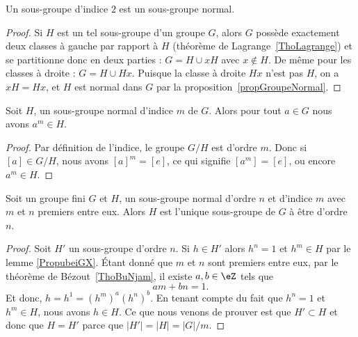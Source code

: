 \begin{lemma}    \label{LemSkIOOG}
	Un sous-groupe d'indice \( 2\) est un sous-groupe normal.
\end{lemma}

\begin{proof}
	Si \( H\) est un tel sous-groupe d'un groupe \( G\), alors \( G\) possède exactement deux classes à gauche par rapport à \( H\) (théorème de Lagrange~\ref{ThoLagrange}) et se partitionne donc en deux parties : \( G=H\cup xH\) avec \( x \notin H \). De même pour les classes à droite : \( G=H\cup Hx\). Puisque la classe à droite \( Hx \) n'est pas \( H\), on a \( xH = Hx \), et \( H\) est normal dans \( G\) par la proposition~\ref{propGroupeNormal}.
\end{proof}

\begin{lemma}\label{PropubeiGX}
	Soit \( H\), un sous-groupe normal d'indice \( m\) de \( G\). Alors pour tout \( a\in G\) nous avons \( a^m\in H\).
\end{lemma}

\begin{proof}
	Par définition de l'indice, le groupe \( G/H\) est d'ordre \( m\). Donc si \( [a]\in G/H\), nous avons \( [a]^m=[e]\), ce qui signifie \( [a^m]=[e]\), ou encore \( a^m\in H\).
\end{proof}

\begin{proposition}     \label{PROPooVWVIooQzuAlA}
	Soit un groupe fini \( G\) et \( H\), un sous-groupe normal d'ordre \( n\) et d'indice \( m\) avec \( m\) et \( n\) premiers entre eux. Alors \( H\) est l'unique sous-groupe de \( G\) à être d'ordre \( n\).
\end{proposition}

\begin{proof}
	Soit \( H'\) un sous-groupe d'ordre \( n\). Si \( h\in H'\) alors \( h^n=1\) et \( h^m\in H\) par le lemme \ref{PropubeiGX}. Étant donné que \( m\) et \( n\) sont premiers entre eux, par le théorème de Bézout~\ref{ThoBuNjam}, il existe \( a,b\in \eZ\) tels que
	\begin{equation}
		am+bn=1.
	\end{equation}
	Et donc, \( h=h^1=(h^m)^a(h^n)^b\). En tenant compte du fait que \( h^n=1\) et \( h^m\in H\), nous avons \( h\in H\). Ce que nous venons de prouver est que \( H'\subset H\) et donc que \( H=H'\) parce que \( | H' |=| H |=| G |/m\).
\end{proof}

